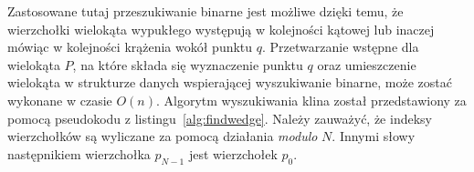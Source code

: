 






Zastosowane tutaj przeszukiwanie binarne jest możliwe dzięki temu, że
wierzchołki wielokąta wypukłego występują w kolejności kątowej lub
inaczej mówiąc w kolejności krążenia wokół punktu $q$. Przetwarzanie
wstępne dla wielokąta $P$, na które składa się wyznaczenie punktu $q$
oraz umieszczenie wielokąta w strukturze danych wspierającej
wyszukiwanie binarne, może zostać wykonane w czasie $O(n)$. Algorytm
wyszukiwania klina został przedstawiony za pomocą pseudokodu z
listingu~\ref{alg:findwedge}. Należy zauważyć, że indeksy wierzchołków
są wyliczane za pomocą działania \emph{modulo} $N$. Innymi słowy
następnikiem wierzchołka $p_{N-1}$ jest wierzchołek $p_0$.


